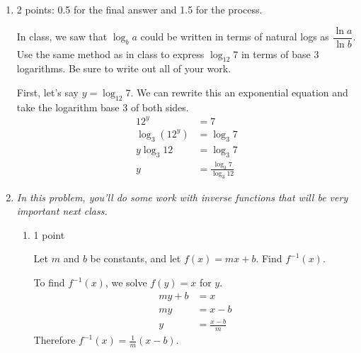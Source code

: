 \documentclass{article}
\begin{document}
\begin{enumerate}
\begin{enumerate}[resume]
  \end{enumerate}

\item \label{change-of-base-practice}

  \begin{grading}
    2 points: 0.5 for the final answer and 1.5 for the process.
  \end{grading}

  \begin{problem}[\vfill]
    In class, we saw that $\log_b a$ could be written in terms of natural logs as $\dfrac{\ln a}{\ln b}$. Use the same method as in class to express $\log_{12} 7$ in terms of base 3 logarithms. Be sure to write out all of your work. 
  \end{problem}

  \begin{solution}
    First, let's say $y=\log_{12} 7$. We can rewrite this an 
    exponential equation and take the logarithm base 3 of both sides.
    \begin{align*}
      12^y &= 7 \\
      \log_3(12^y) &= \log_3 7 \\
      y \log_3 12 &= \log_3 7 \\
      y &= \frac{\log_3 7}{\log_3 12}
    \end{align*}
  \end{solution}

\item \label{inverse-function-deriv-preview}

  \emph{In this problem, you'll do some work with inverse functions that will be very important next class.}

  \begin{enumerate}
  \item

    \begin{grading}
      1 point
    \end{grading}

    \begin{problem}[\stretch{0.75}]
      Let $m$ and $b$ be constants, and let $f(x) = mx + b$. Find $f^{-1}(x)$.
    \end{problem}

    \begin{solution}
      To find $f^{-1}(x)$, we solve $f(y)=x$ for $y$.
      \begin{align*}
        my + b &= x\\
        my &= x-b \\
        y &= \frac{x-b}{m}
      \end{align*}
      Therefore $f^{-1}(x)=\frac{1}{m}(x-b)$.
    \end{solution}


\end{enumerate}
\end{enumerate}
\end{document}
